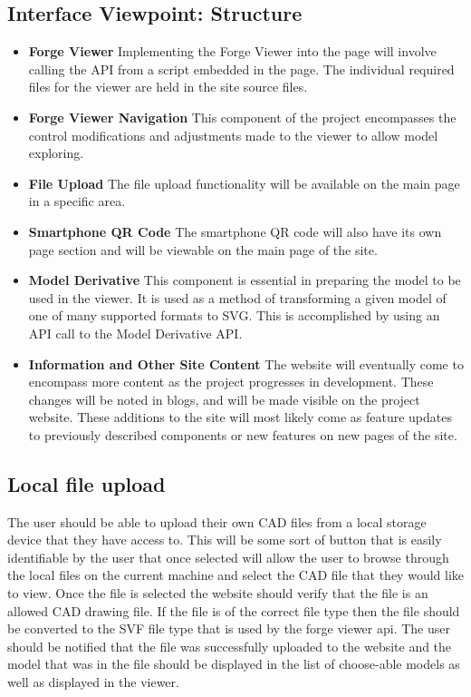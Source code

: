 \documentclass[letterpaper, 10pt, draftclsnofoot, compsoc, onecolumn]{IEEEtran}
\begin{document}
\subsection{Interface Viewpoint: Structure}
\begin{itemize}
	 \item[]\textbf{Forge Viewer} Implementing the Forge Viewer into the page will involve calling the API from a script embedded in the page. The individual required files for the viewer are held in the site source files.
	
	\item[]\textbf{Forge Viewer Navigation} This component of the project encompasses the control modifications and adjustments made to the viewer to allow model exploring.
	 
	\item[]\textbf{File Upload} The file upload functionality will be available on the main page in a specific area.
	
	\item[]\textbf{Smartphone QR Code}  The smartphone QR code will also have its own page section and will be viewable on the main page of the site.
	
	\item[]\textbf{Model Derivative} This component is essential in preparing the model to be used in the viewer. It is used as a method of transforming a given model of one of many supported formats to SVG. This is accomplished by using an API call to the Model Derivative API.
	
	\item[]\textbf{Information and Other Site Content} The website will eventually come to encompass more content as the project progresses in development. These changes will be noted in blogs, and will be made visible on the project website. These additions to the site will most likely come as feature updates to previously described components or new features on new pages of the site.
\end{itemize}

\subsection{Local file upload}
	The user should be able to upload their own CAD files from a local storage device that they have access to. This will be some sort of button that is easily identifiable by the user that once selected will allow the user to browse through the local files on the current machine and select the CAD file that they would like to view. Once the file is selected the website should verify that the file is an allowed CAD drawing file. If the file is of the correct file type then the file should be converted to the SVF file type that is used by the forge viewer api. The user should be notified that the file was successfully uploaded to the website and the model that was in the file should be displayed in the list of choose-able models as well as displayed in the viewer. 
\end{document}
